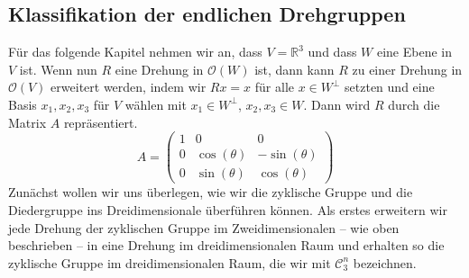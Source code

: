 \subsection{Klassifikation der endlichen Drehgruppen}
Für das folgende Kapitel nehmen wir an, dass $V = \mathbb{R}^3$ und dass $W$ eine Ebene in $V$ ist. Wenn nun $R$ eine Drehung in $\mathcal{O}(W)$ ist, dann kann $R$ zu einer Drehung in $\mathcal{O}(V)$ erweitert werden, indem wir $Rx=x$ für alle $x \in W^\perp$ setzten und eine Basis ${x_1,x_2,x_3}$ für $V$ wählen mit $x_1 \in W^\perp$, $x_2, x_3 \in W$. Dann wird $R$ durch die Matrix $A$ repräsentiert.
$$A=\begin{pmatrix}
1 & 0 & 0 \\
    0 & \cos{(\theta)} & -\sin{(\theta)} \\
    0 & \sin{(\theta)} & \cos{(\theta)}
\end{pmatrix} $$
Zunächst wollen wir uns überlegen, wie wir die zyklische Gruppe und die Diedergruppe ins Dreidimensionale überführen können. Als erstes erweitern wir jede Drehung der zyklischen Gruppe im Zweidimensionalen -- wie oben beschrieben -- in eine Drehung im dreidimensionalen Raum und erhalten so die zyklische Gruppe im dreidimensionalen Raum, die wir mit $\mathcal{C}_3^n$ bezeichnen.


